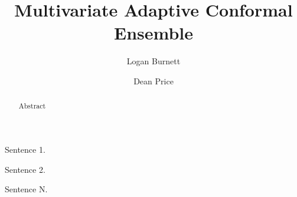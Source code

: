 \documentclass[numbers,review,3p,times]{elsarticle}
\begin{document}
\begin{frontmatter}



\title{Multivariate Adaptive Conformal Ensemble}


\author[MIT]{Logan Burnett} %
\author[MIT]{Dean Price}%






\begin{abstract}
Abstract
\end{abstract}


\begin{highlights}
\item Sentence 1.
\item Sentence 2.
\item Sentence N.
\end{highlights}


\end{frontmatter}
\end{document}
